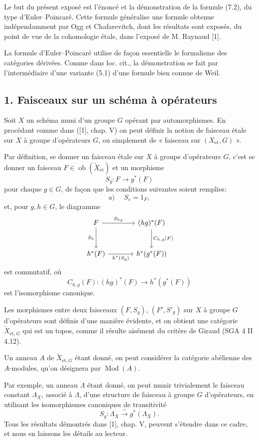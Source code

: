 \documentclass[11pt]{article}
\providecommand{\et}{\mathrm{\acute{e}t}}
\providecommand{\Ob}{\operatorname{ob}}
\providecommand{\Ob}{\operatorname{ob}}
\providecommand{\Ob}{\operatorname{Ob}}
\providecommand{\Mod}{\operatorname{Mod}}
\providecommand{\Ob}{\operatorname{ob}}
\providecommand{\Ob}{\operatorname{Ob}}
\providecommand{\et}{\acute{e}t}
\begin{document}
Le but du présent exposé est l'énoncé et la démonstration de la formule (7.2), du type d'Euler--Poincaré. Cette formule généralise une formule obtenue indépendamment par Ogg et Chafarevitch, dont les résultats sont exposés, du point de vue de la cohomologie étale, dans l'exposé de M. Raynaud [1].

La formule d'Euler--Poincaré utilise de façon essentielle le formalisme des catégories dérivées. Comme dans loc. cit., la démonstration se fait par l'intermédiaire d'une variante (5.1) d'une formule bien connue de Weil.

\subsection*{1. Faisceaux sur un schéma à opérateurs}

Soit $X$ un schéma muni d'un groupe $G$ opérant par automorphismes. En procédant comme dans ([1], chap. V) on peut définir la notion de faisceau étale sur $X$ à groupe d'opérateurs $G$, ou simplement de « faisceau sur $(X_{\et},G)$ ».

Par définition, se donner un faisceau étale sur $X$ à groupe d'opérateurs $G$, c'est se donner un faisceau $F\in \Ob(\widetilde X_{\et})$ et un morphisme
\[
S_g:F\longrightarrow g^*(F)
\]
pour chaque $g\in G$, de façon que les conditions suivantes soient remplies:
\[
\text{a) }\quad S_e=1_F,
\]
et, pour $g,h\in G$, le diagramme
\[
\begin{tikzcd}[column sep=large,row sep=large]
F \arrow[r,"S_{hg}"] \arrow[d,"S_h"'] & (hg)^*(F) \arrow[d,"C_{h,g}(F)"]\\
h^*(F) \arrow[r,"h^*(S_g)"'] & h^*(g^*(F))
\end{tikzcd}
\]
est commutatif, où
\[
C_{h,g}(F):(hg)^*(F)\longrightarrow h^*(g^*(F))
\]
est l'isomorphisme canonique.

Les morphismes entre deux faisceaux $(F,S_g)$, $(F',S'_g)$ sur $X$ à groupe $G$ d'opérateurs sont définis d'une manière évidente, et on obtient une catégorie $\widetilde X_{\et,G}$ qui est un topos, comme il résulte aisément du critère de Giraud (SGA 4 II 4.12).

Un anneau $A$ de $\widetilde X_{\et,G}$ étant donné, on peut considérer la catégorie abélienne des $A$-modules, qu'on désignera par $\Mod(A)$.

Par exemple, un anneau $\Lambda$ étant donné, on peut munir trivialement le faisceau constant $\Lambda_X$, associé à $\Lambda$, d'une structure de faisceau à groupe $G$ d'opérateurs, en utilisant les isomorphismes canoniques de transitivité
\[
S_g:\Lambda_X\xrightarrow{\sim}g^*(\Lambda_X).
\]
Tous les résultats démontrés dans [1], chap. V, peuvent s'étendre dans ce cadre, et nous en laissons les détails au lecteur.
\end{document}
